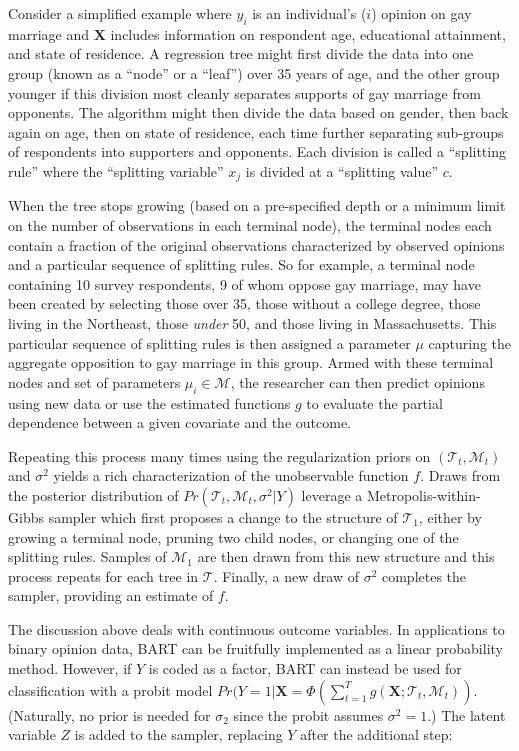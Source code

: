 \documentclass[]{article}
\begin{document}
Consider a simplified example where \(y_i\) is an individual's (\(i\))
opinion on gay marriage and \(\mathbf{X}\) includes information on
respondent age, educational attainment, and state of residence. A
regression tree might first divide the data into one group (known as a
``node'' or a ``leaf'') over 35 years of age, and the other group
younger if this division most cleanly separates supports of gay marriage
from opponents. The algorithm might then divide the data based on
gender, then back again on age, then on state of residence, each time
further separating sub-groups of respondents into supporters and
opponents. Each division is called a ``splitting rule'' where the
``splitting variable'' \(x_j\) is divided at a ``splitting value''
\(c\).

When the tree stops growing (based on a pre-specified depth or a minimum
limit on the number of observations in each terminal node), the terminal
nodes each contain a fraction of the original observations characterized
by observed opinions and a particular sequence of splitting rules. So
for example, a terminal node containing 10 survey respondents, 9 of whom
oppose gay marriage, may have been created by selecting those over 35,
those without a college degree, those living in the Northeast, those
\emph{under} 50, and those living in Massachusetts. This particular
sequence of splitting rules is then assigned a parameter \(\mu\)
capturing the aggregate opposition to gay marriage in this group. Armed
with these terminal nodes and set of parameters
\(\mu_i \in \mathcal{M}\), the researcher can then predict opinions
using new data or use the estimated functions \(g\) to evaluate the
partial dependence between a given covariate and the outcome.

Repeating this process many times using the regularization priors on
\((\mathcal{T}_t,\mathcal{M}_t)\) and \(\sigma^2\) yields a rich
characterization of the unobservable function \(f\). Draws from the
posterior distribution of \(Pr(\mathcal{T}_t,\mathcal{M}_t,\sigma^2|Y)\)
leverage a Metropolis-within-Gibbs sampler which first proposes a change
to the structure of \(\mathcal{T_1}\), either by growing a terminal
node, pruning two child nodes, or changing one of the splitting rules.
Samples of \(\mathcal{M}_1\) are then drawn from this new structure and
this process repeats for each tree in \(\mathcal{T}\). Finally, a new
draw of \(\sigma^2\) completes the sampler, providing an estimate of
\(f\).

The discussion above deals with continuous outcome variables. In
applications to binary opinion data, BART can be fruitfully implemented
as a linear probability method. However, if \(Y\) is coded as a factor,
BART can instead be used for classification with a probit model
\(Pr(Y = 1|\mathbf{X} = \Phi(\sum_{t = 1}^Tg(\mathbf{X};\mathcal{T}_t,\mathcal{M}_t))\).
(Naturally, no prior is needed for \(\sigma_2\) since the probit assumes
\(\sigma^2 = 1\).) The latent variable \(Z\) is added to the sampler,
replacing \(Y\) after the additional step:
\end{document}
